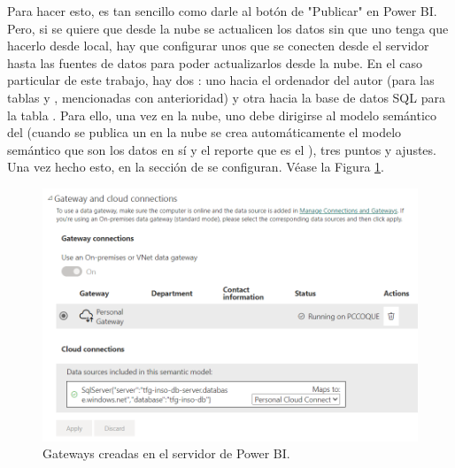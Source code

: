 Para hacer esto, es tan sencillo como darle al botón de "Publicar" en Power BI. Pero, si se quiere que desde la nube se actualicen los datos sin que uno tenga que hacerlo desde local, hay que configurar unos  que se conecten desde el servidor hasta las fuentes de datos para poder actualizarlos desde la nube. En el caso particular de este trabajo, hay dos : uno hacia el ordenador del autor (para las  tablas  y , mencionadas con anterioridad) y otra hacia la base de datos SQL para la tabla . Para  ello, una vez en la nube, uno debe dirigirse al modelo semántico del  (cuando se publica un  en la nube se crea automáticamente el modelo semántico que son los  datos en sí y el reporte que es el ), tres puntos y ajustes. Una vez hecho esto, en la sección de  se configuran.
Véase la Figura \ref{PBIgateways}.

\begin{figure}[H]
    \centering
    \includegraphics[scale = 0.7]{imgs/PBIgateways.png}
    \caption{Gateways creadas en el servidor de Power BI.}
    \label{PBIgateways}
\end{figure}



